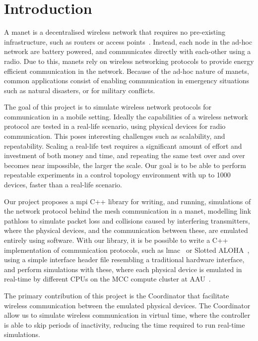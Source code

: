 \chapter{Introduction}
A \gls{manet} is a decentralised wireless network that requires no pre-existing infrastructure, such as
routers or access points~\cite{inproceedings:routingsurvery}. Instead, each node in the ad-hoc network are
battery powered, and communicates directly with each-other using a radio. Due to this, \gls{manet}s rely on
wireless networking protocols to provide energy efficient communication in the network. Because of the ad-hoc
nature of \gls{manet}s, common applications consist of enabling communication in emergency situations such as
natural disasters, or for military conflicts.\smallbreak

The goal of this project is to simulate wireless network protocols for communication in a mobile setting.
Ideally the capabilities of a wireless network protocol are tested in a real-life scenario, using physical
devices for radio communication. This poses interesting challenges such as scalability, and repeatability.
Scaling a real-life test requires a significant amount of effort and investment of both money and time, and
repeating the same test over and over becomes near impossible, the larger the scale. Our goal is to be able to
perform repeatable experiments in a control topology environment with up to 1000 devices, faster than a
real-life scenario.\smallbreak

Our project proposes a \gls{mpi} C++ library for writing, and running, simulations of the network protocol
behind the mesh communication in a \gls{manet}, modelling link \gls{pathloss} to simulate packet loss and
collisions caused by interfering transmitters, where the physical devices, and the communication between
these, are emulated entirely using software. With our library, it is be possible to write a C++ implementation
of communication protocols, such as \gls{lmac}~\cite{paper:lmac_protocol} or Slotted
ALOHA~\cite{Roberts:1975:APS:1024916.1024920}, using a simple interface header file resembling a traditional
hardware interface, and perform simulations with these, where each physical device is emulated in real-time by
different CPUs on the MCC compute cluster at AAU~\cite{website:mccaau}. \smallbreak

The primary contribution of this project is the Coordinator that facilitate wireless communication
between the emulated physical devices. The Coordinator allow us to simulate wireless communication
in virtual time, where the controller is able to skip periods of inactivity, reducing the time required to run
real-time simulations.

